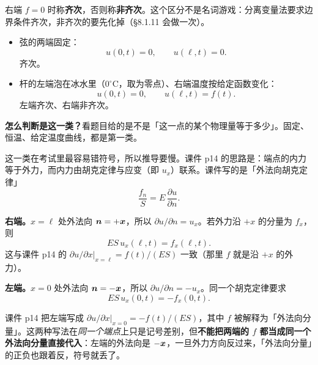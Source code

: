 右端 $f=0$ 时称\textbf{齐次}，否则称\textbf{非齐次}。这个区分不是名词游戏：分离变量法要求边界条件齐次，非齐次的要先化掉（\S8.1.11 会做一次）。


\begin{itemize}
  \item 弦的两端固定：
  \begin{equation}
    u(0,t)=0,\qquad u(\ell,t)=0 .
  \end{equation}
  齐次。
  \item 杆的左端泡在冰水里（$0^\circ\mathrm C$，取为零点）、右端温度按给定函数变化：
  \begin{equation}
    u(0,t)=0,\qquad u(\ell,t)=f(t).
  \end{equation}
  左端齐次、右端非齐次。
\end{itemize}

\textbf{怎么判断是这一类？}看题目给的是不是「这一点的某个物理量等于多少」。固定、恒温、给定温度曲线，都是第一类。

\label{sec:bc2}

这一类在考试里最容易错符号，所以推导要慢。课件 p14 的思路是：端点的内力等于外力，而内力由胡克定律与应变（即 $u_x$）联系。课件写的是「外法向胡克定律」
\begin{equation}
  \frac{f_n}{S}=E\,\frac{\partial u}{\partial n}.
\end{equation}

\textbf{右端。}$x=\ell$ 处外法向 $\boldsymbol{n}=+\boldsymbol{x}$，所以 $\partial u/\partial n=u_x$。若外力沿 $+x$ 的分量为 $f_x$，则
\begin{equation}
  ES\,u_x(\ell,t)=f_x(\ell,t).
\end{equation}
这与课件 p14 的 $\partial u/\partial x\big|_{x=\ell}=f(t)/(ES)$ 一致（那里 $f$ 就是沿 $+x$ 的外力）。

\textbf{左端。}$x=0$ 处外法向 $\boldsymbol{n}=-\boldsymbol{x}$，所以 $\partial u/\partial n=-u_x$。同一个胡克定律要求
\begin{equation}
  ES\,u_x(0,t)=-f_x(0,t).
\end{equation}

课件 p14 把左端写成 $\partial u/\partial x\big|_{x=0}=-f(t)/(ES)$，其中 $f$ 被解释为「外法向分量」。这两种写法在\emph{同一个端点}上只是记号差别，但\textbf{不能把两端的 $f$ 都当成同一个外法向分量直接代入}：左端的外法向是 $-\boldsymbol{x}$，一旦外力方向反过来，「外法向分量」的正负也跟着反，符号就丢了。

